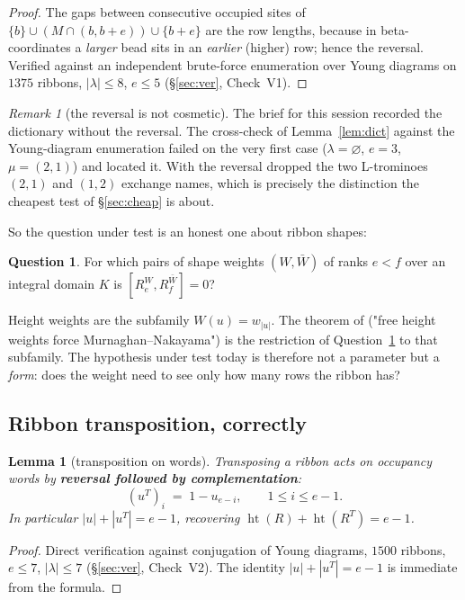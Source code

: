 \documentclass[11pt]{article}
\newtheorem{lemma}[theorem]{Lemma}
\theoremstyle{definition}
\newtheorem{question}[theorem]{Question}
\theoremstyle{remark}
\newtheorem{remark}[theorem]{Remark}
\newcommand{\hgtt}{\operatorname{ht}}
\begin{document}
\begin{proof}
The gaps between consecutive occupied sites of $\{b\}\cup(M\cap(b,b+e))\cup\{b+e\}$ are
the row lengths, because in beta-coordinates a \emph{larger} bead sits in an
\emph{earlier} (higher) row; hence the reversal.  Verified against an independent
brute-force enumeration over Young diagrams on $1375$ ribbons, $|\lambda|\le8$, $e\le5$
(\S\ref{sec:ver}, Check~V1).
\end{proof}

\begin{remark}[the reversal is not cosmetic]
The brief for this session recorded the dictionary without the reversal.  The
cross-check of Lemma~\ref{lem:dict} against the Young-diagram enumeration failed on the
very first case ($\lambda=\varnothing$, $e=3$, $\mu=(2,1)$) and located it.  With the
reversal dropped the two L-trominoes $(2,1)$ and $(1,2)$ exchange names, which is
precisely the distinction the cheapest test of \S\ref{sec:cheap} is about.
\end{remark}

So the question under test is an honest one about ribbon shapes:

\begin{question}\label{q:main}
For which pairs of shape weights $(W,\bar W)$ of ranks $e<f$ over an integral domain $K$
is $[R_e^{W},R_f^{\bar W}]=0$?
\end{question}

Height weights are the subfamily $W(u)=w_{|u|}$.  The theorem of
\cite[2026-09-11 c2]{Q147} ("free height weights force Murnaghan--Nakayama") is the
restriction of Question~\ref{q:main} to that subfamily.  The hypothesis under test today
is therefore not a parameter but a \emph{form}: does the weight need to see only how many
rows the ribbon has?

\subsection*{Ribbon transposition, correctly}

\begin{lemma}[transposition on words]\label{lem:transpose}
Transposing a ribbon acts on occupancy words by \textbf{reversal followed by
complementation}:
\[
   (u^{T})_i \;=\; 1-u_{e-i},\qquad 1\le i\le e-1 .
\]
In particular $|u|+|u^{T}|=e-1$, recovering $\hgtt(R)+\hgtt(R^{T})=e-1$.
\end{lemma}

\begin{proof}
Direct verification against conjugation of Young diagrams, $1500$ ribbons, $e\le7$,
$|\lambda|\le7$ (\S\ref{sec:ver}, Check~V2).  The identity $|u|+|u^T|=e-1$ is immediate
from the formula.
\end{proof}
\end{document}
